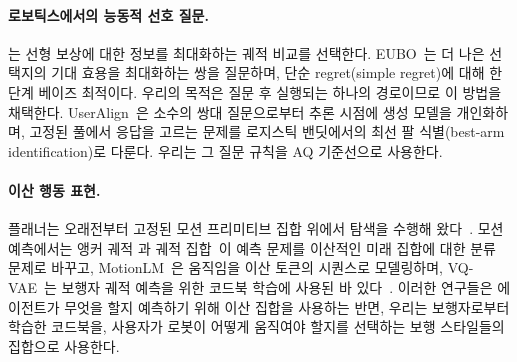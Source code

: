 \paragraph{로보틱스에서의 능동적 선호 질문.}
\citet{sadigh2017active}는 선형 보상에 대한 정보를 최대화하는 궤적 비교를 선택한다.
EUBO~\citep{astudillo2023qeubo}는 더 나은 선택지의 기대 효용을 최대화하는 쌍을 질문하며, 단순 regret(simple regret)에 대해 한 단계 베이즈
최적이다. 우리의 목적은 질문 후 실행되는 하나의 경로이므로 이 방법을 채택한다.
UserAlign~\citep{padurean2025useralign}은 소수의 쌍대 질문으로부터 추론 시점에 생성 모델을 개인화하며, 고정된 풀에서 응답을 고르는 문제를
로지스틱 밴딧에서의 최선 팔 식별(best-arm identification)로 다룬다. 우리는 그 질문 규칙을 AQ 기준선으로 사용한다.

\paragraph{이산 행동 표현.}
플래너는 오래전부터 고정된 모션 프리미티브 집합 위에서 탐색을 수행해 왔다~\citep{pivtoraiko2009lattice}. 모션 예측에서는 앵커 궤적
\citep{chai2019multipath}과 궤적 집합~\citep{phanminh2020covernet}이 예측 문제를 이산적인 미래 집합에 대한 분류 문제로 바꾸고,
MotionLM~\citep{seff2023motionlm}은 움직임을 이산 토큰의 시퀀스로 모델링하며, VQ-VAE~\citep{vandenoord2017neural}는
보행자 궤적 예측을 위한 코드북 학습에 사용된 바 있다~\citep{benaglia2024lowrank}. 이러한 연구들은 에이전트가 무엇을 할지 예측하기 위해
이산 집합을 사용하는 반면, 우리는 보행자로부터 학습한 코드북을, 사용자가 로봇이 어떻게 움직여야 할지를 선택하는 보행 스타일들의 집합으로 사용한다.
